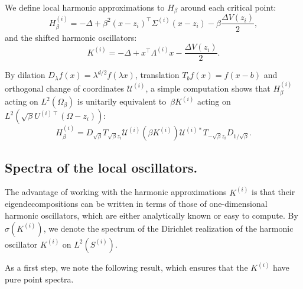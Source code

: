 \documentclass[10pt]{article}
\newcommand{\R}{\mathbb{R}}
\newcommand{\1}{\mathbbm 1}
\begin{document}
    We define local harmonic approximations to $H_\beta$ around each critical point:
    \[ H_\beta^{(i)} = -\Delta + \beta^2 (x-z_i)^\intercal \Sigma^{(i)}(x-z_i) - \beta \frac{\Delta V(z_i)}2, \]
    and the shifted harmonic oscillators:
    \[K^{(i)} = -\Delta  + x^\intercal \Lambda^{(i)}x -\frac{\Delta V(z_i)}2.\]

    By dilation $D_\lambda f(x) = \lambda^{d/2}f(\lambda x)$, translation $T_b f(x) = f(x-b)$ and orthogonal change of coordinates $\mathcal U^{(i)}$, a simple computation shows that
    $H_{\beta}^{(i)}$ acting on $L^2(\Omega_\beta)$ is unitarily equivalent to~$\beta K^{(i)}$ acting on~$L^2(\sqrt{\beta}U^{(i)\intercal}(\Omega-z_i))$:
    \[H_{\beta}^{(i)} = D_{\sqrt\beta}T_{\sqrt\beta z_i}\mathcal U^{(i)}\left(\beta K^{(i)}\right)\mathcal U^{(i)*}T_{-\sqrt\beta z_i}D_{1/\sqrt\beta}.\]


    \subsection{Spectra of the local oscillators.}
    The advantage of working with the harmonic approximations $K^{(i)}$ is that their eigendecompositions can be written in terms of those of one-dimensional harmonic oscillators, which are either analytically known or easy to compute.
    By $\sigma(K^{(i)})$, we denote the spectrum of the Dirichlet realization of the harmonic oscillator $K^{(i)}$ on $L^2(S^{(i)})$.

    As a first step, we note the following result, which ensures that the $K^{(i)}$ have pure point spectra.
\end{document}
